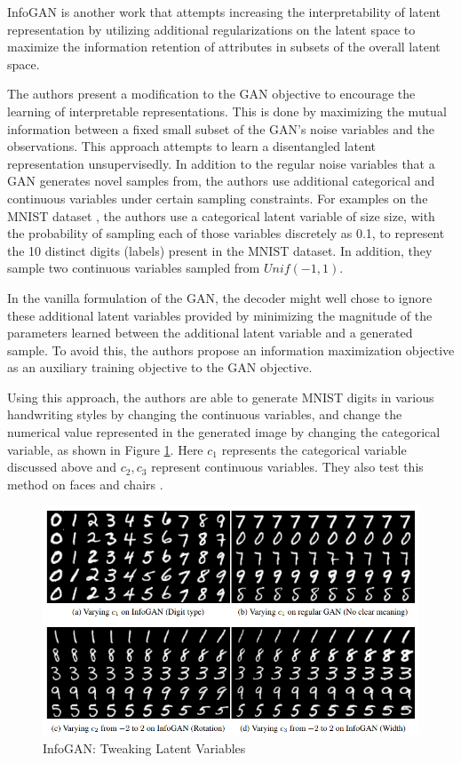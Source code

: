 InfoGAN \citep{chen2016infogan} is another work that attempts increasing the interpretability of latent representation by utilizing additional regularizations on the latent space to maximize the information retention of attributes in subsets of the overall latent space.

The authors present a modification to the GAN objective \citep{goodfellow2014generative} to encourage the learning of interpretable representations. This is done by maximizing the
mutual information between a fixed small subset of the GAN's noise variables and the observations. This approach attempts to learn a disentangled latent representation unsupervisedly. In addition to the regular noise variables that a GAN generates novel samples from, the authors use additional categorical and continuous variables under certain sampling constraints. For examples on the MNIST dataset \citep{lecun2010mnist}, the authors use a categorical latent variable of size size, with the probability of sampling each of those variables discretely as 0.1, to represent the 10 distinct digits (labels) present in the MNIST dataset. In addition, they sample two continuous variables sampled from $Unif(-1, 1)$.

In the vanilla formulation of the GAN, the decoder might well chose to ignore these additional latent variables provided by minimizing the magnitude of the parameters learned between the additional latent variable and a generated sample. To avoid this, the authors propose an information maximization objective as an auxiliary training objective to the GAN objective.

Using this approach, the authors are able to generate MNIST digits in various handwriting styles by changing the continuous variables, and change the numerical value represented in the generated image by changing the categorical variable, as shown in Figure \ref{fig:infogan-digits}. Here $c_1$ represents the categorical variable discussed above and $c_2, c_3$ represent continuous variables. They also test this method on faces \citep{liu2015deep,paysan20093d} and chairs \citep{aubry2014seeing}.

\begin{figure}[ht]
	\centering
	\includegraphics[width=\textwidth]{images/infogan-digits}
	\caption{\label{fig:infogan-digits} InfoGAN: Tweaking Latent Variables}
\end{figure}


